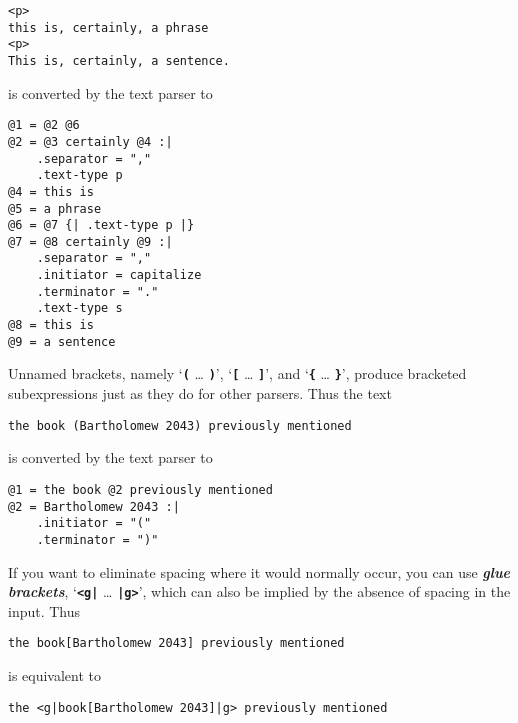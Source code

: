 \documentclass[12pt]{article}
\newcommand{\TT}[1]{{\tt \bfseries #1}}
\newcommand{\skey}[2]{{\bf \em #1#2}\index{#1}}
\newenvironment{indpar}[1][0.3in]%
	{\begin{list}{}%
		     {\setlength{\itemsep}{0in}%
		      \setlength{\topsep}{0in}%
		      \setlength{\parsep}{1ex}%
		      \setlength{\labelwidth}{#1}%
		      \setlength{\leftmargin}{#1}%
		      \addtolength{\leftmargin}{\labelsep}}%
	 \item}%
	{\end{list}}
\begin{document}
\begin{indpar}\begin{verbatim}
<p>
this is, certainly, a phrase
<p>
This is, certainly, a sentence.
\end{verbatim}\end{indpar}

is converted by the text parser to

\begin{indpar}\begin{verbatim}
@1 = @2 @6
@2 = @3 certainly @4 :|
    .separator = ","
    .text-type p
@4 = this is
@5 = a phrase
@6 = @7 {| .text-type p |}
@7 = @8 certainly @9 :|
    .separator = ","
    .initiator = capitalize
    .terminator = "."
    .text-type s
@8 = this is
@9 = a sentence
\end{verbatim}\end{indpar}

Unnamed brackets, namely
`\TT{(} \ldots{} \TT{)}',
`\TT{[} \ldots{} \TT{]}', and
`\TT{\{} \ldots{} \TT{\}}',
produce bracketed subexpressions just as they do for other
parsers.  Thus the text

\begin{indpar}\begin{verbatim}
the book (Bartholomew 2043) previously mentioned
\end{verbatim}\end{indpar}

is converted by the text parser to

\begin{indpar}\begin{verbatim}
@1 = the book @2 previously mentioned
@2 = Bartholomew 2043 :|
    .initiator = "("
    .terminator = ")"
\end{verbatim}\end{indpar}

If you want to eliminate spacing where it would normally occur,
you can use \skey{glue bracket}s, `\TT{<g|} \ldots{} \TT{|g>}',
which can also be implied by the absence of spacing in the input.
Thus

\begin{indpar}\begin{verbatim}
the book[Bartholomew 2043] previously mentioned
\end{verbatim}\end{indpar}

is equivalent to

\begin{indpar}\begin{verbatim}
the <g|book[Bartholomew 2043]|g> previously mentioned
\end{verbatim}\end{indpar}
\end{document}
